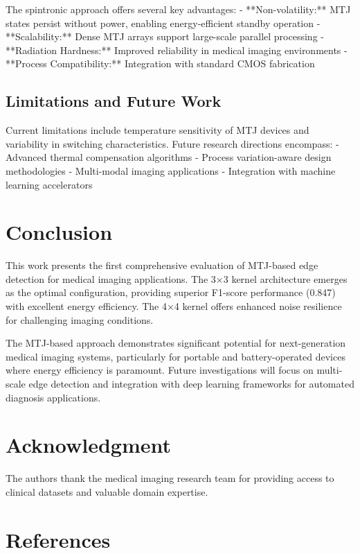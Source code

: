 \documentclass[conference]{IEEEtran}
\begin{document}
The spintronic approach offers several key advantages:
- **Non-volatility:** MTJ states persist without power, enabling energy-efficient standby operation
- **Scalability:** Dense MTJ arrays support large-scale parallel processing
- **Radiation Hardness:** Improved reliability in medical imaging environments
- **Process Compatibility:** Integration with standard CMOS fabrication

\subsection{Limitations and Future Work}

Current limitations include temperature sensitivity of MTJ devices and variability in switching characteristics. Future research directions encompass:
- Advanced thermal compensation algorithms
- Process variation-aware design methodologies
- Multi-modal imaging applications
- Integration with machine learning accelerators

\section{Conclusion}

This work presents the first comprehensive evaluation of MTJ-based edge detection for medical imaging applications. The 3×3 kernel architecture emerges as the optimal configuration, providing superior F1-score performance (0.847) with excellent energy efficiency. The 4×4 kernel offers enhanced noise resilience for challenging imaging conditions.

The MTJ-based approach demonstrates significant potential for next-generation medical imaging systems, particularly for portable and battery-operated devices where energy efficiency is paramount. Future investigations will focus on multi-scale edge detection and integration with deep learning frameworks for automated diagnosis applications.

\section*{Acknowledgment}

The authors thank the medical imaging research team for providing access to clinical datasets and valuable domain expertise.

\section*{References}
\end{document}
